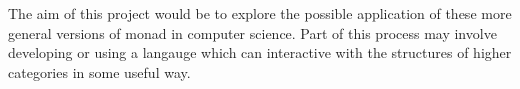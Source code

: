 \documentclass[14pt,letter]{article}
\begin{document}
The aim of this project would be to explore the possible application 
of these more general versions of monad in computer science. Part of this process may involve developing or using a langauge which can interactive with the structures of higher categories in some useful way.



\end{document}
